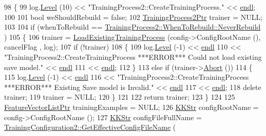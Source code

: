 \begin{DoxyCode}
98 \{
99   log.\hyperlink{class_k_k_b_1_1_run_log_a32cf761d7f2e747465fd80533fdbb659}{Level} (10) << \textcolor{stringliteral}{"TrainingProcess2::CreateTrainingProcess."} << \hyperlink{namespace_k_k_b_ad1f50f65af6adc8fa9e6f62d007818a8}{endl};
100 
101   \textcolor{keywordtype}{bool}  weShouldRebuild = \textcolor{keyword}{false};
102   \hyperlink{class_k_k_m_l_l_1_1_training_process2}{TrainingProcess2Ptr} trainer = NULL;
103 
104   \textcolor{keywordflow}{if}  (whenToRebuild == \hyperlink{class_k_k_m_l_l_1_1_training_process2_acc48e76f6978c8c8c0c849eec2d0ee53ad2a9e8494ea01fc1f0e1c8925eb94cd2}{TrainingProcess2::WhenToRebuild::NeverRebuild}
      )
105   \{
106     trainer = \hyperlink{class_k_k_m_l_l_1_1_training_process2_acb1e01bb8bae43fda6fa37136766aacc}{LoadExistingTrainingProcess} (config->ConfigRootName (), cancelFlag
      , log);
107     \textcolor{keywordflow}{if}  (!trainer)
108     \{
109       log.\hyperlink{class_k_k_b_1_1_run_log_a32cf761d7f2e747465fd80533fdbb659}{Level} (-1) << \hyperlink{namespace_k_k_b_ad1f50f65af6adc8fa9e6f62d007818a8}{endl}
110         << \textcolor{stringliteral}{"TrainingProcess2::CreateTrainingProcess   ***ERROR***   Could not load existing save model."} <<
       \hyperlink{namespace_k_k_b_ad1f50f65af6adc8fa9e6f62d007818a8}{endl}
111         << \hyperlink{namespace_k_k_b_ad1f50f65af6adc8fa9e6f62d007818a8}{endl};
112     \}
113     \textcolor{keywordflow}{else} \textcolor{keywordflow}{if}  (trainer->\hyperlink{class_k_k_m_l_l_1_1_training_process2_a11725f4aac3b45c7a070bc78aa406724}{Abort} ())
114     \{
115       log.\hyperlink{class_k_k_b_1_1_run_log_a32cf761d7f2e747465fd80533fdbb659}{Level} (-1) << \hyperlink{namespace_k_k_b_ad1f50f65af6adc8fa9e6f62d007818a8}{endl}
116         << \textcolor{stringliteral}{"TrainingProcess2::CreateTrainingProcess   ***ERROR***   Existing Save model is Invalid."} << 
      \hyperlink{namespace_k_k_b_ad1f50f65af6adc8fa9e6f62d007818a8}{endl}
117         << \hyperlink{namespace_k_k_b_ad1f50f65af6adc8fa9e6f62d007818a8}{endl};
118       \textcolor{keyword}{delete}  trainer;
119       trainer = NULL;
120     \}
121 
122     \textcolor{keywordflow}{return} trainer;
123   \}
124 
125   \hyperlink{class_k_k_m_l_l_1_1_feature_vector_list}{FeatureVectorListPtr}  trainingExamples = NULL;
126   \hyperlink{class_k_k_b_1_1_k_k_str}{KKStr}  configRootName = config->ConfigRootName ();
127   \hyperlink{class_k_k_b_1_1_k_k_str}{KKStr}  configFileFullName = 
      \hyperlink{class_k_k_m_l_l_1_1_training_configuration2_a1805f10e0a83f752f0d501de6c11b3c3}{TrainingConfiguration2::GetEffectiveConfigFileName} (

\end{DoxyCode}
